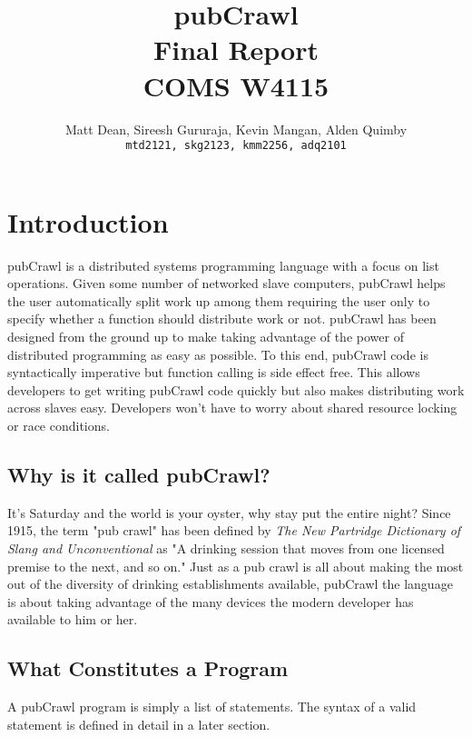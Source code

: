 \documentclass[oneside]{book}
\title{
  pubCrawl \\ Final Report \\ \vspace{2 mm}
  \large{COMS W4115}
}
\author{
  Matt Dean, Sireesh Gururaja, Kevin Mangan, Alden Quimby\\
  \texttt{mtd2121, skg2123, kmm2256, adq2101}
}
\begin{document}
\maketitle
\tableofcontents


\chapter{Introduction}
pubCrawl is a distributed systems programming language with a focus on list operations. Given some number of networked slave computers, pubCrawl helps the user automatically split work up among them requiring the user only to specify whether a function should distribute work or not. pubCrawl has been designed from the ground up to make taking advantage of the power of distributed programming as easy as possible. To this end, pubCrawl code is syntactically imperative but function calling is side effect free. This allows developers to get writing pubCrawl code quickly but also makes distributing work across slaves easy. Developers won't have to worry about shared resource locking or race conditions. 

\section{Why is it called pubCrawl?}
It's Saturday and the world is your oyster, why stay put the entire night? Since 1915, the term "pub crawl" has been defined by \textit{The New Partridge Dictionary of Slang and Unconventional} as "A drinking session that moves from one licensed premise to the next, and so on." Just as a pub crawl is all about making the most out of the diversity of drinking establishments available, pubCrawl the language is about taking advantage of the many devices the modern developer has available to him or her. 

\section{What Constitutes a Program}
A pubCrawl program is simply a list of statements. The syntax of a valid statement is defined in detail in a later section.


\end{document}
